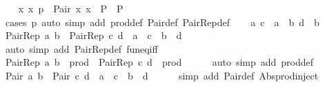 \begin{isabellebody}
\ \ \isamarkupfalse%
\ {\isachardoublequoteopen}{\isacharparenleft}{\kern0pt}{\isasymAnd}x{}\ x{}{\isachardot}{\kern0pt}\ p\ {\isacharequal}{\kern0pt}\ Pair\ x{}\ x{}\ {\isasymLongrightarrow}\ P{\isacharparenright}{\kern0pt}\ {\isasymLongrightarrow}\ P{\isachardoublequoteclose}\isanewline
\ \ \ \ \isamarkupfalse%
\ {\isacharparenleft}{\kern0pt}cases\ p{\isacharparenright}{\kern0pt}\ {\isacharparenleft}{\kern0pt}auto\ simp\ add{\isacharcolon}{\kern0pt}\ prod{\isacharunderscore}{\kern0pt}def\ Pair{\isacharunderscore}{\kern0pt}def\ Pair{\isacharunderscore}{\kern0pt}Rep{\isacharunderscore}{\kern0pt}def{\isacharparenright}{\kern0pt}\isanewline
{}\isamarkupfalse%
\isanewline
\ \ \isamarkupfalse%
\ a\ c\ {\isacharcolon}{\kern0pt}{\isacharcolon}{\kern0pt}\ {\isacharprime}{\kern0pt}a\ \ b\ d\ {\isacharcolon}{\kern0pt}{\isacharcolon}{\kern0pt}\ {\isacharprime}{\kern0pt}b\isanewline
\ \ \isamarkupfalse%
\ {\isachardoublequoteopen}Pair{\isacharunderscore}{\kern0pt}Rep\ a\ b\ {\isacharequal}{\kern0pt}\ Pair{\isacharunderscore}{\kern0pt}Rep\ c\ d\ {\isasymlongleftrightarrow}\ a\ {\isacharequal}{\kern0pt}\ c\ {\isasymand}\ b\ {\isacharequal}{\kern0pt}\ d{\isachardoublequoteclose}\isanewline
\ \ \ \ \isamarkupfalse%
\ {\isacharparenleft}{\kern0pt}auto\ simp\ add{\isacharcolon}{\kern0pt}\ Pair{\isacharunderscore}{\kern0pt}Rep{\isacharunderscore}{\kern0pt}def\ fun{\isacharunderscore}{\kern0pt}eq{\isacharunderscore}{\kern0pt}iff{\isacharparenright}{\kern0pt}\isanewline
\ \ \isamarkupfalse%
\ \isamarkupfalse%
\ {\isachardoublequoteopen}Pair{\isacharunderscore}{\kern0pt}Rep\ a\ b\ {\isasymin}\ prod{\isachardoublequoteclose}\ \ {\isachardoublequoteopen}Pair{\isacharunderscore}{\kern0pt}Rep\ c\ d\ {\isasymin}\ prod{\isachardoublequoteclose}\isanewline
\ \ \ \ \isamarkupfalse%
\ {\isacharparenleft}{\kern0pt}auto\ simp\ add{\isacharcolon}{\kern0pt}\ prod{\isacharunderscore}{\kern0pt}def{\isacharparenright}{\kern0pt}\isanewline
\ \ \isamarkupfalse%
\ \isamarkupfalse%
\ {\isachardoublequoteopen}Pair\ a\ b\ {\isacharequal}{\kern0pt}\ Pair\ c\ d\ {\isasymlongleftrightarrow}\ a\ {\isacharequal}{\kern0pt}\ c\ {\isasymand}\ b\ {\isacharequal}{\kern0pt}\ d{\isachardoublequoteclose}\isanewline
\ \ \ \ \isamarkupfalse%
\ {\isacharparenleft}{\kern0pt}simp\ add{\isacharcolon}{\kern0pt}\ Pair{\isacharunderscore}{\kern0pt}def\ Abs{\isacharunderscore}{\kern0pt}prod{\isacharunderscore}{\kern0pt}inject{\isacharparenright}{\kern0pt}\isanewline

\end{isabellebody}
